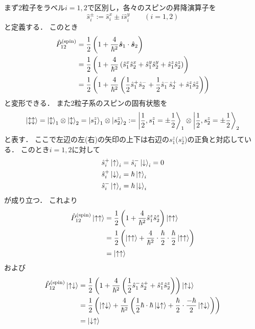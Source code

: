 \documentclass[a4paper,11pt]{jsarticle}
\begin{document}
まず2粒子をラベル$i=1,2$で区別し，各々のスピンの昇降演算子を
\begin{equation}
  \hat{s}^{\pm}_i := \hat{s}^{x}_i \pm i \hat{s}^{y}_i \qquad (i = 1,2)
\end{equation}
と定義する．
このとき
\begin{align}
  \hat{P}^{(\mathrm{spin})}_{12} &= \frac{1}{2}\left(1 + \frac{4}{\hbar^2} \hat{\bm{s}}_1\cdot \hat{\bm{s}}_2\right) \notag\\
  &= \frac{1}{2}\left(1 + \frac{4}{\hbar^2} \left(\hat{s}^x_1 \hat{s}^x_2 + \hat{s}^y_1 \hat{s}^y_2 + \hat{s}^z_1 \hat{s}^z_2 \right)\right) \notag\\
  &=  \frac{1}{2}\left(1 + \frac{4}{\hbar^2} \left(\frac{1}{2}\hat{s}^{+}_1 \hat{s}^{-}_2 + \frac{1}{2}\hat{s}^{-}_1 \hat{s}^{+}_2 + \hat{s}^z_1 \hat{s}^z_2 \right)\right)  
\end{align}
と変形できる．
また2粒子系のスピンの固有状態を
\begin{equation}
  \ket{\updownarrow \updownarrow} = \ket{\updownarrow}_1\otimes \ket{\updownarrow}_2 = \ket{s^z_1}_1\otimes\ket{s^z_2}_2 := \ket{\frac{1}{2}, s^z_1 = \pm\frac{1}{2}}_1 \otimes \ket{\frac{1}{2}, s^z_2=\pm\frac{1}{2}}_2
\end{equation}
と表す．
ここで左辺の左(右)の矢印の上下は右辺の$s^z_1$($s^z_2$)の正負と対応している．
このとき$i=1,2$に対して
\begin{align}
  &\hat{s}^{+}_i \ket{\uparrow}_i = \hat{s}^{-}_i \ket{\downarrow}_i = 0 \\
  &\hat{s}^{+}_i \ket{\downarrow}_i = \hbar\ket{\uparrow}_i \\
  &\hat{s}^{-}_i \ket{\uparrow}_i = \hbar\ket{\downarrow}_i
\end{align}
が成り立つ．
これより
\begin{align}
  \hat{P}^{(\mathrm{spin})}_{12} \ket{\uparrow \uparrow} &= \frac{1}{2}\left(1 + \frac{4}{\hbar^2} \hat{s}^z_1 \hat{s}^z_2 \right) \ket{\uparrow \uparrow} \notag\\
  &= \frac{1}{2}\left(\ket{\uparrow \uparrow} + \frac{4}{\hbar^2} \cdot\frac{\hbar}{2} \cdot\frac{\hbar}{2} \ket{\uparrow \uparrow}\right) \notag\\
  &= \ket{\uparrow \uparrow}
\end{align}
および
\begin{align}
  \hat{P}^{(\mathrm{spin})}_{12} \ket{\uparrow \downarrow} &=  \frac{1}{2}\left(1 + \frac{4}{\hbar^2} \left(\frac{1}{2}\hat{s}^{-}_1 \hat{s}^{+}_2 + \hat{s}^z_1 \hat{s}^z_2 \right)\right) \ket{\uparrow \downarrow} \notag\\
  &= \frac{1}{2}\left(\ket{\uparrow \downarrow} + \frac{4}{\hbar^2}\left(\frac{1}{2}\hbar\cdot\hbar \ket{\downarrow \uparrow} + \frac{\hbar}{2} \cdot\frac{-\hbar}{2}\ket{\uparrow \downarrow}\right)  \right) \notag\\
  &= \ket{\downarrow \uparrow}
\end{align}
\end{document}
